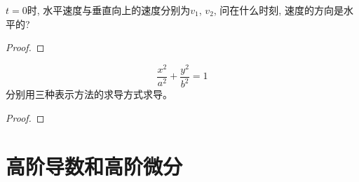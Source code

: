 \begin{example}
    $t = 0$时, 水平速度与垂直向上的速度分别为$v_1$, $v_2$, 问在什么时刻, 速度的方向是水平的?
\end{example}
\begin{proof}
    
\end{proof}

\begin{example}
    \begin{equation*}
        \frac{x^2}{a^2} + \frac{y^2}{b^2} = 1
    \end{equation*}
    分别用三种表示方法的求导方式求导。
\end{example}
\begin{proof}
    
\end{proof}

\section{高阶导数和高阶微分}

